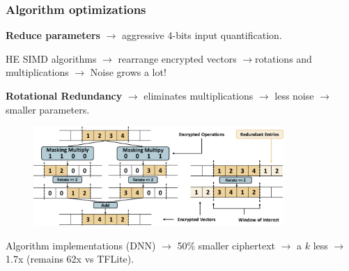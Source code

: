 \documentclass[10pt]{beamer}
\begin{document}
\begin{frame}
\frametitle{Algorithm optimizations}
    \textbf{Reduce parameters}  $\rightarrow$ aggressive 4-bits input quantification.
    \vspace{-0.2cm}

    \pause
 HE SIMD algorithms $\rightarrow$ rearrange encrypted vectors  $\rightarrow$rotations and multiplications  $\rightarrow$ Noise grows a lot!

    \pause
    \vspace{-0.2cm}
    \textbf{Rotational Redundancy} $\rightarrow$ eliminates multiplications $\rightarrow$ less noise $\rightarrow$ smaller parameters.


    \pause
    \vspace{-0.4cm}
\begin{figure}
    \includegraphics[width=0.85\textwidth]{rotation.png}
\end{figure}
    \pause
    \vspace{-0.4cm}
    Algorithm implementations (DNN) $\rightarrow$ 50\% smaller ciphertext $\rightarrow$ a $k$  less $\rightarrow$ 1.7x (remains 62x vs TFLite).

\end{frame}

\end{document}
